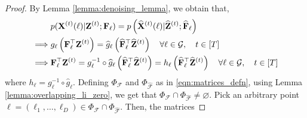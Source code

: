 \begin{proof}
    By Lemma \ref{lemma:denoising_lemma}, we obtain that,
    \begin{align}
        &p(\mathbf{X}^{(t)}(\ell) | \mathbf{Z}^{(t)} ; \mathbf{F}_{\ell}) = p \left(\widehat{\mathbf{X}}^{(t)}(\ell)| \widehat{\mathbf{Z}}^{(t)}; \widehat{\mathbf{F}}_{\ell} \right) \nonumber \\
         \implies & g_{\ell}\left(\mathbf{F}_{\ell}^\top \mathbf{Z}^{(t)}\right) = \widehat{g}_{\ell} \left( \widehat{\mathbf{F}}_{\ell}^\top \widehat{\mathbf{Z}}^{(t)} \right) \quad \forall \ell \in \mathcal{G}, \quad t \in [T] \nonumber \\
         \implies & \mathbf{F}_{\ell}^\top \mathbf{Z}^{(t)} = g_{\ell}^{-1} \circ \widehat{g}_{\ell} \left( \widehat{\mathbf{F}}_{\ell}^\top \widehat{\mathbf{Z}}^{(t)} \right) = h_{\ell} \left( \widehat{\mathbf{F}}_{\ell}^\top \widehat{\mathbf{Z}}^{(t)} \right) \quad \forall \ell \in \mathcal{G}, \quad t \in [T] \label{eqn:sfp_proof_intermediate}
    \end{align}
    where $\displaystyle h_{\ell} = g_{\ell}^{-1} \circ \widehat{g}_{\ell}$. Defining $\Phi_\mathcal{F}$ and $\Phi_{\widehat{\mathcal{F}}}$ as in \eqref{eqn:matrices_defn}, using Lemma \ref{lemma:overlapping_li_zero}, we get that $\displaystyle \Phi_\mathcal{F} \cap \Phi_{\widehat{\mathcal{F}}} \neq \varnothing$. Pick an arbitrary point $\mathbf{\boldsymbol \ell} = \left(\ell_1, \ldots, \ell_D \right) \in  \Phi_\mathcal{F} \cap \Phi_{\widehat{\mathcal{F}}}$. Then, the matrices 


\end{proof}
